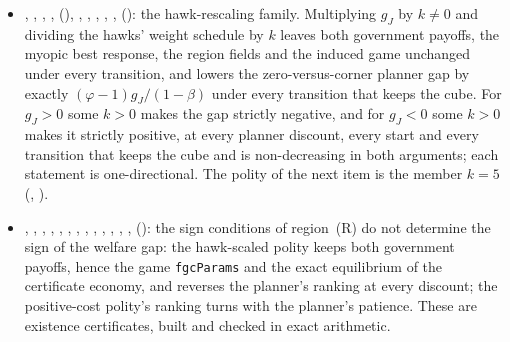 \begin{itemize}[leftmargin=1.4em,itemsep=1pt]
\item {}, , , ,  (), , , , , ,  (): the hawk-rescaling family. Multiplying $g_J$ by $k\ne0$ and dividing the hawks' weight schedule by $k$ leaves both government payoffs, the myopic best response, the region fields and the induced game unchanged under every transition, and lowers the zero-versus-corner planner gap by exactly $(\varphi-1)g_J/(1-\beta)$ under every transition that keeps the cube. For $g_J>0$ some $k>0$ makes the gap strictly negative, and for $g_J<0$ some $k>0$ makes it strictly positive, at every planner discount, every start and every transition that keeps the cube and is non-decreasing in both arguments; each statement is one-directional. The polity of the next item is the member $k=5$ (, ).
\item {}, , , , , , , , , , , , ,  (): the sign conditions of region~(R) do not determine the sign of the welfare gap: the hawk-scaled polity keeps both government payoffs, hence the game \texttt{fgcParams} and the exact equilibrium of the certificate economy, and reverses the planner's ranking at every discount; the positive-cost polity's ranking turns with the planner's patience. These are existence certificates, built and checked in exact arithmetic.

\end{itemize}
